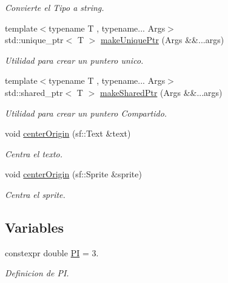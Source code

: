 \begin{DoxyCompactItemize}
\begin{DoxyCompactList}\small\item\em Convierte el Tipo a string. \end{DoxyCompactList}\item 
{\footnotesize template$<$typename T , typename... Args$>$ }\\std\+::unique\+\_\+ptr$<$ T $>$ \hyperlink{namespaceant_1_1_utils_aa7e961d002a27860ac8d502d9f214865}{make\+Unique\+Ptr} (Args \&\&...args)
\begin{DoxyCompactList}\small\item\em Utilidad para crear un puntero unico. \end{DoxyCompactList}\item 
{\footnotesize template$<$typename T , typename... Args$>$ }\\std\+::shared\+\_\+ptr$<$ T $>$ \hyperlink{namespaceant_1_1_utils_af110086ca94443bd1aa42f01008db7cb}{make\+Shared\+Ptr} (Args \&\&...args)
\begin{DoxyCompactList}\small\item\em Utilidad para crear un puntero Compartido. \end{DoxyCompactList}\item 
void \hyperlink{namespaceant_1_1_utils_a7620f9eb67146a08b1ea9f7647daedf2}{center\+Origin} (sf\+::\+Text \&text)
\begin{DoxyCompactList}\small\item\em Centra el texto. \end{DoxyCompactList}\item 
void \hyperlink{namespaceant_1_1_utils_af450e216756fc8aa0fa32dfc148a492f}{center\+Origin} (sf\+::\+Sprite \&sprite)
\begin{DoxyCompactList}\small\item\em Centra el sprite. \end{DoxyCompactList}\end{DoxyCompactItemize}
\subsection*{Variables}
\begin{DoxyCompactItemize}
\item 
constexpr double \hyperlink{namespaceant_1_1_utils_ae9b5ccdeb3ee02a6f4f26c1e2a6f02be}{P\+I} = 3.
\begin{DoxyCompactList}\small\item\em Definicion de P\+I. \end{DoxyCompactList}\end{DoxyCompactItemize}


